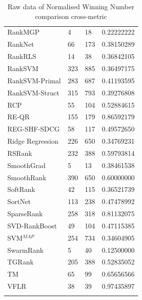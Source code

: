 \documentclass{sig-alternate-2013}
\begin{document}
\begin{longtable}{p{3.2cm}|p{1.3cm}|p{1.3cm}|p{1.4cm}}
RankMGP & 4 & 18 & 0.22222222 \\ 
RankNet & 66 & 173 & 0.38150289 \\ 
RankRLS & 14 & 38 & 0.36842105 \\ 
RankSVM & 323 & 885 & 0.36497175 \\ 
RankSVM-Primal & 283 & 687 & 0.41193595 \\ 
RankSVM-Struct & 315 & 793 & 0.39276808 \\ 
RCP & 55 & 104 & 0.52884615 \\ 
RE-QR & 155 & 179 & 0.86592179 \\ 
REG-SHF-SDCG & 58 & 117 & 0.49572650 \\ 
Ridge Regression & 226 & 650 & 0.34769231 \\ 
RSRank & 232 & 388 & 0.59793814 \\ 
SmoothGrad & 5 & 13 & 0.38461538 \\ 
SmoothRank & 390 & 650 & 0.60000000 \\ 
SoftRank & 42 & 115 & 0.36521739 \\ 
SortNet & 113 & 238 & 0.47478992 \\ 
SparseRank & 258 & 318 & 0.81132075 \\ 
SVD-RankBoost & 49 & 104 & 0.47115385 \\ 
SVM$^{MAP}$ & 254 & 734 & 0.34604905 \\ 
SwarmRank & 5 & 40 & 0.12500000 \\ 
TGRank & 205 & 388 & 0.52835052 \\ 
TM & 65 & 99 & 0.65656566 \\ 
VFLR & 38 & 39 & 0.97435897 \\
\bottomrule
\caption{Raw data of Normalised Winning Number comparison cross-metric}
\label{tab:raw_data_norm_winnum_all}
\end{longtable}
\end{document}
